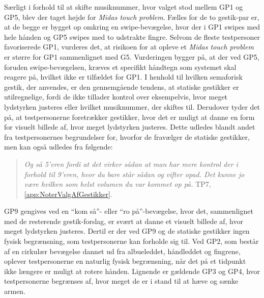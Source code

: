 Særligt i forhold til at skifte musiknummer, hvor valget stod mellem GP1 og GP5, blev der taget højde for \textit{Midas touch problem}. Fælles for de to gestik-par er, at de begge er bygget op omkring en swipe-bevægelse, hvor der i GP1 swipes med hele hånden og GP5 swipes med to udstrakte fingre. Selvom de fleste testpersoner favoriserede GP1, vurderes det, at risikoen for at opleve et \textit{Midas touch problem} er større for GP1 sammenlignet med G5. Vurderingen bygger på, at der ved GP5, foruden swipe-bevægelsen, kræves et specifikt håndtegn som systemet skal reagere på, hvilket ikke er tilfældet for GP1.\blankline
%
I henhold til hvilken semaforisk gestik, der anvendes, er den gennemgående tendens, at statiske gestikker er utilregnelige, fordi de ikke tillader kontrol over eksempelvis, hvor meget lydstyrken justeres eller hvilket musiknummer, der skiftes til. Derudover tyder det på, at testpersonerne foretrækker gestikker, hvor det er muligt at danne en form for visuelt billede af, hvor meget lydstyrken justeres. Dette udledes blandt andet fra testpersonernes begrundelser for, hvorfor de fravælger de statiske gestikker, men kan også udledes fra følgende:  
%
\begin{quotation}
	\noindent
	\textit{Og så 5'eren fordi at det virker sådan at man har mere kontrol der i forhold til 9'eren, hvor du bare står sådan og vifter opad. Det kunne jo være hvilken som helst volumen du var kommet op på.} TP7, \autoref{app:NoterValgAfGestikker}.
\noindent
\end{quotation}
%
GP9 gengives ved en \enquote{kom så}- eller \enquote{ro på}-bevægelse, hvor det, sammenlignet med de resterende gestik-forslag, er svært at danne et visuelt billede af, hvor meget lydstyrken justeres. Dertil er der ved GP9 og de statiske gestikker ingen fysisk begrænsning, som testpersonerne kan forholde sig til. Ved GP2, som består af en cirkulær bevægelse dannet ud fra albueleddet, håndleddet og fingrene, oplever testpersonerne en naturlig fysisk begrænsning, når det på et tidpunkt ikke længere er muligt at rotere hånden. Lignende er gældende GP3 og GP4, hvor testpersonerne begrænses af, hvor meget de er i stand til at hæve og sænke armen.

